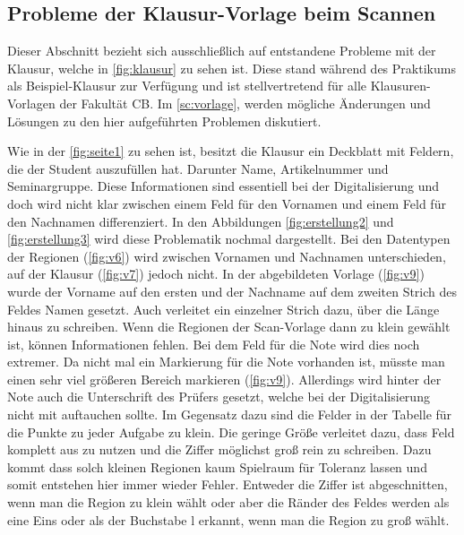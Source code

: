 \documentclass[notables, nomenclature, oneside, 150]{HSMW-Thesis}
\begin{document}
		\subsection{Probleme der Klausur-Vorlage beim Scannen}\label{ssc:problemevorlage}
			Dieser Abschnitt bezieht sich ausschließlich auf entstandene Probleme mit der Klausur, welche in \autoref{fig:klausur} zu sehen ist. Diese stand während des Praktikums als Beispiel-Klausur zur Verfügung und ist stellvertretend für alle Klausuren-Vorlagen der Fakultät CB. Im \autoref{sc:vorlage}, werden mögliche Änderungen und Lösungen zu den hier aufgeführten Problemen diskutiert.
		
			Wie in der \autoref{fig:seite1} zu sehen ist, besitzt die Klausur ein Deckblatt mit Feldern, die der Student auszufüllen hat. Darunter Name, Artikelnummer und Seminargruppe. Diese Informationen sind essentiell bei der Digitalisierung und doch wird nicht klar zwischen einem Feld für den Vornamen und einem Feld für den Nachnamen differenziert. In den Abbildungen \ref{fig:erstellung2} und \ref{fig:erstellung3} wird diese Problematik nochmal dargestellt. Bei den Datentypen der Regionen (\ref{fig:v6}) wird zwischen Vornamen und Nachnamen unterschieden, auf der Klausur (\ref{fig:v7}) jedoch nicht. In der abgebildeten Vorlage (\ref{fig:v9}) wurde der Vorname auf den ersten und der Nachname auf dem zweiten Strich des Feldes Namen gesetzt. Auch verleitet ein einzelner Strich dazu, über die Länge hinaus zu schreiben. Wenn die Regionen der Scan-Vorlage dann zu klein gewählt ist, können Informationen fehlen. Bei dem Feld für die Note wird dies noch extremer. Da nicht mal ein Markierung für die Note vorhanden ist, müsste man einen sehr viel größeren Bereich markieren (\ref{fig:v9}). Allerdings wird hinter der Note auch die Unterschrift des Prüfers gesetzt, welche bei der Digitalisierung nicht mit auftauchen sollte. Im Gegensatz dazu sind die Felder in der Tabelle für die Punkte zu jeder Aufgabe zu klein. Die geringe Größe verleitet dazu, dass Feld komplett aus zu nutzen und die Ziffer möglichst groß rein zu schreiben. Dazu kommt dass solch kleinen Regionen kaum Spielraum für Toleranz lassen und somit entstehen hier immer wieder Fehler. Entweder die Ziffer ist abgeschnitten, wenn man die Region zu klein wählt oder aber die Ränder des Feldes werden als eine Eins oder als der Buchstabe l erkannt, wenn man die Region zu groß wählt.
\end{document}
